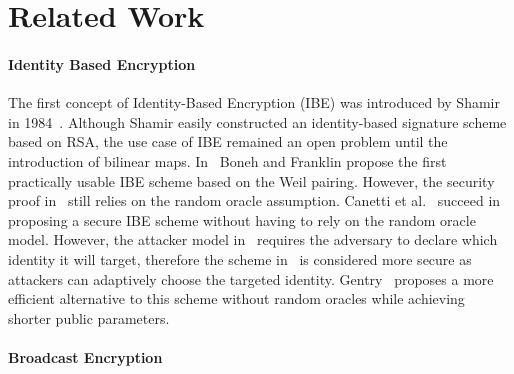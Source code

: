 \documentclass[11pt]{article}
\begin{document}
\section*{Related Work}

\paragraph{Identity Based Encryption} The first concept of Identity-Based Encryption (IBE) was introduced by Shamir in 1984~\cite{DBLP:conf/crypto/Shamir84}. Although Shamir easily constructed an identity-based signature scheme based on RSA, the use case of IBE remained an open problem until the introduction of bilinear maps. In~\cite{BonehFranklinIBE} Boneh and Franklin propose the first practically usable IBE scheme based on the Weil pairing. However, the security proof in~\cite{BonehFranklinIBE} still relies on the random oracle assumption. Canetti et al.~\cite{Canetti} succeed in proposing a secure IBE scheme without having to rely on the random oracle model. However, the attacker model in~\cite{Canetti} requires the adversary to declare which identity it will target, therefore the scheme in~\cite{BonehBoyenRandomOracles} is considered more secure as attackers can adaptively choose the targeted identity. Gentry~\cite{GentryRandomOracles} proposes a more efficient alternative to this scheme without random oracles while achieving shorter public parameters. 

\paragraph{Broadcast Encryption}


\end{document}
